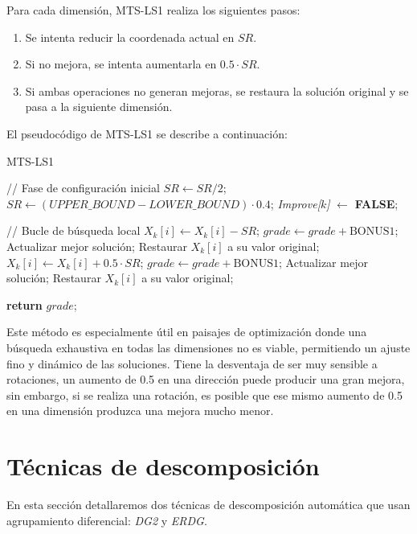 Para cada dimensión, MTS-LS1 realiza los siguientes pasos:
\begin{enumerate}
	\item Se intenta reducir la coordenada actual en $SR$.
	\item Si no mejora, se intenta aumentarla en $0.5 \cdot SR$.
	\item Si ambas operaciones no generan mejoras, se restaura la solución original y se pasa a la siguiente dimensión.
\end{enumerate}


El pseudocódigo de MTS-LS1 se describe a continuación:

\begin{algorithm}
\caption{MTS-LS1}
\begin{algorithmic}[1]
\STATE // Fase de configuración inicial
    \STATE $SR \gets SR / 2$;
        \STATE $SR \gets (UPPER\_BOUND - LOWER\_BOUND) \cdot 0.4$;
    \ENDIF
\ENDIF
\STATE \textit{Improve[$k$]} $\gets$ \textbf{FALSE};

\STATE // Bucle de búsqueda local
    \STATE $X_k[i] \gets X_k[i] - SR$;
        \STATE $grade \gets grade + \text{BONUS1}$;
        \STATE Actualizar mejor solución;
    \ELSE
        \STATE Restaurar $X_k[i]$ a su valor original;
        \STATE $X_k[i] \gets X_k[i] + 0.5 \cdot SR$;
            \STATE $grade \gets grade + \text{BONUS1}$;
            \STATE Actualizar mejor solución;
        \ELSE
            \STATE Restaurar $X_k[i]$ a su valor original;
        \ENDIF
    \ENDIF
\ENDFOR

\STATE \textbf{return} $grade$;
\end{algorithmic}
\end{algorithm}


Este método es especialmente útil en paisajes de optimización donde una búsqueda exhaustiva en todas las dimensiones no es viable, permitiendo un ajuste fino y dinámico de las soluciones. Tiene la desventaja de ser muy sensible a rotaciones, un aumento de 0.5 en una dirección puede producir una gran mejora, sin embargo, si se realiza una rotación, es posible que ese mismo aumento de 0.5 en una dimensión produzca una mejora mucho menor.	


\section{Técnicas de descomposición}
En esta sección detallaremos dos técnicas de descomposición automática que usan agrupamiento diferencial: \textit{DG2} y \textit{ERDG}. 

